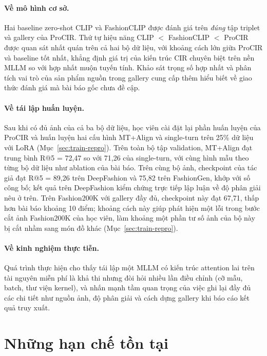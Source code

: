 \paragraph{Về mô hình cơ sở.} Hai baseline zero-shot CLIP và FashionCLIP được đánh giá trên \emph{đúng} tập triplet và gallery của ProCIR. Thứ tự hiệu năng CLIP $<$ FashionCLIP $<$ ProCIR được quan sát nhất quán trên cả hai bộ dữ liệu, với khoảng cách lớn giữa ProCIR và baseline tốt nhất, khẳng định giá trị của kiến trúc CIR chuyên biệt trên nền MLLM so với hợp nhất muộn tuyến tính. Khảo sát trọng số hợp nhất và phân tích vai trò của sản phẩm nguồn trong gallery cung cấp thêm hiểu biết về giao thức đánh giá mà bài báo gốc chưa đề cập.

\paragraph{Về tái lập huấn luyện.} Sau khi có đủ ảnh của cả ba bộ dữ liệu, học viên cài đặt lại phần huấn luyện của ProCIR và huấn luyện hai cấu hình MT+Align và single-turn trên 25\% dữ liệu với LoRA (Mục~\ref{sec:train-repro}). Trên toàn bộ tập validation, MT+Align đạt trung bình R@5 = 72,47 so với 71,26 của single-turn, với cùng hình mẫu theo từng bộ dữ liệu như ablation của bài báo. Trên cùng bộ ảnh, checkpoint của tác giả đạt R@5 = 89,26 trên DeepFashion và 75,82 trên FashionGen, khớp với số công bố; kết quả trên DeepFashion kiểm chứng trực tiếp lập luận về độ phân giải nêu ở trên. Trên Fashion200K với gallery đầy đủ, checkpoint này đạt 67,71, thấp hơn bài báo khoảng 10 điểm; khoảng cách này giúp phát hiện một lỗi trong bước cắt ảnh Fashion200K của học viên, làm khoảng một phần tư số ảnh của bộ này bị cắt nhầm sang món đồ khác (Mục~\ref{sec:train-repro}).

\paragraph{Về kinh nghiệm thực tiễn.} Quá trình thực hiện cho thấy tái lập một MLLM có kiến trúc attention lai trên tài nguyên miễn phí là khả thi nhưng đòi hỏi nhiều lần điều chỉnh (cỡ mẫu, batch, thư viện kernel), và nhấn mạnh tầm quan trọng của việc ghi lại đầy đủ các chi tiết như nguồn ảnh, độ phân giải và cách dựng gallery khi báo cáo kết quả truy xuất.

\section{Những hạn chế tồn tại}

